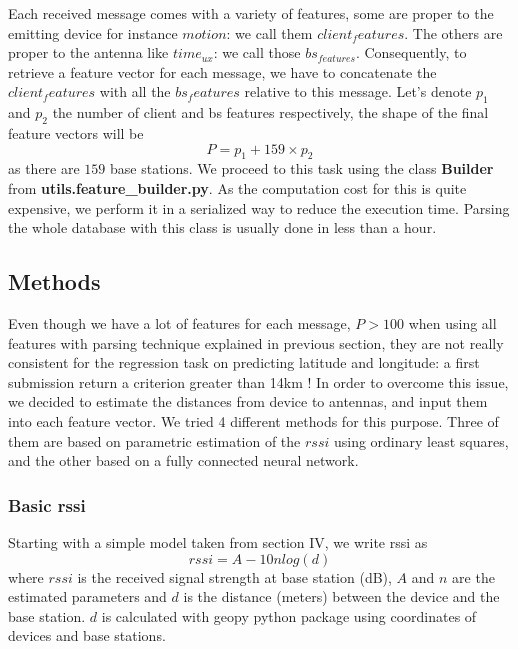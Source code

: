 \documentclass[twocolumn,2pt]{article}
\begin{document}
	Each received message comes with a variety of features, some are proper to the emitting device for instance $motion$: we call them $client_features$. The others are proper to the antenna like $time_{ux}$: we call those $bs_{features}$. Consequently, to retrieve a feature vector for each message, we have to concatenate the $client_features$ with all the $bs_features$ relative to this message. Let's denote $p_1$ and $p_2$ the number of client and bs features respectively, the shape of the final feature vectors will be 
	\begin{equation}
		\label{feature_number}
		P= p_1 + 159 \times p_2
	\end{equation}
	 as there are $159$ base stations. We proceed to this task using the class \textbf{Builder} from \textbf{utils.feature\_builder.py}. As the computation cost for this is quite expensive, we perform it in a serialized way to reduce the execution time. Parsing the whole database with this class is usually done in less than a hour.
	
	
	\subsection{Methods}
	\label{methods}
	Even though we have a lot of features for each message, $P>100$ when using all features with parsing technique explained in previous section, they are not really consistent for the regression task on predicting latitude and longitude: a first submission return a criterion greater than 14km ! In order to overcome this issue, we decided to estimate the distances from device to antennas, and input them into each feature vector. We tried 4 different methods for this purpose. Three of them are based on parametric estimation of the $rssi$ using ordinary least squares, and the other based on a fully connected neural network.
	
	
	\subsubsection*{Basic rssi}
	Starting with a simple model taken from \cite{srbinovska2011localization} section IV, we write rssi as 
	\begin{equation}
	\label{naive_rssi}
		rssi = A - 10 n log(d) 
	\end{equation}
	where $rssi$ is the received signal strength at base station (dB), $A$ and $n$ are the estimated parameters and $d$ is the distance (meters) between the device and the base station. $d$ is calculated with geopy python package using coordinates of devices and base stations.
	
\end{document}
